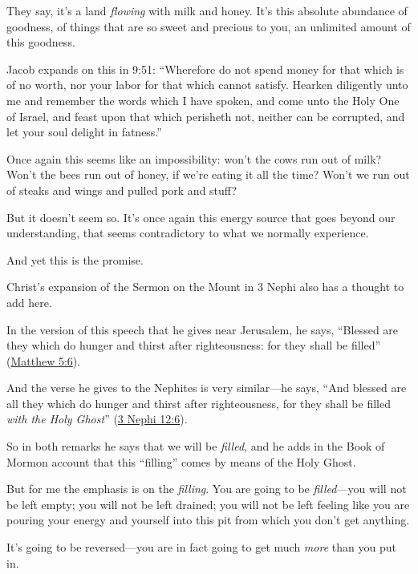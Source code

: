 \begin{compactitem}
\begin{compactitem}
\begin{compactitem}
							\item They say, it's a land \textit{flowing} with milk and honey. It's this absolute abundance of goodness, of things that are so sweet and precious to you, an unlimited amount of this goodness. 
							\item Jacob expands on this in 9:51: ``Wherefore do not spend money for that which is of no worth, nor your labor for that which cannot satisfy. Hearken diligently unto me and remember the words which I have spoken, and come unto the Holy One of Israel, and feast upon that which perisheth not, neither can be corrupted, and let your soul delight in fatness.''
							\item Once again this seems like an impossibility: won't the cows run out of milk? Won't the bees run out of honey, if we're eating it all the time? Won't we run out of steaks and wings and pulled pork and stuff?
							\item But it doesn't seem so. It's once again this energy source that goes beyond our understanding, that seems contradictory to what we normally experience.
							\item And yet this is the promise.							
						\end{compactitem}
					\item Christ's expansion of the Sermon on the Mount in 3 Nephi also has a thought to add here.
						\begin{compactitem}
							\item In the version of this speech that he gives near Jerusalem, he says, ``Blessed are they which do hunger and thirst after righteousness: for they shall be filled'' (\hyperref[MATTHEW-5-6]{Matthew 5:6}).
							\item And the verse he gives to the Nephites is very similar---he says, ``And blessed are all they which do hunger and thirst after righteousness, for they shall be filled \textit{with the Holy Ghost}'' (\hyperref[3NEPHI-12-6]{3 Nephi 12:6}).
							\item So in both remarks he says that we will be \textit{filled}, and he adds in the Book of Mormon account that this ``filling'' comes by means of the Holy Ghost.
							\item But for me the emphasis is on the \textit{filling}. You are going to be \textit{filled}---you will not be left empty; you will not be left drained; you will not be left feeling like you are pouring your energy and yourself into this pit from which you don't get anything. 
							\item It's going to be reversed---you are in fact going to get much \textit{more} than you put in. 

\end{compactitem}
\end{compactitem}
\end{compactitem}
